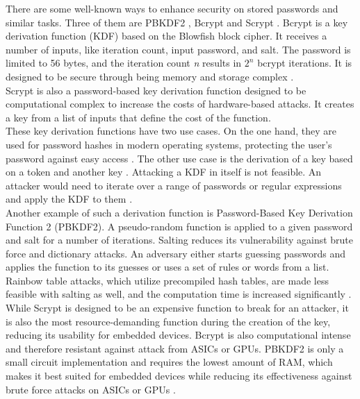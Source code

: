         There are some well-known ways to enhance security on stored passwords and similar tasks. Three of them are PBKDF2 \cite{kaliski_pkcs_2000}, Bcrypt \cite{provos_future-adaptable_1999} and Scrypt \cite{josefsson_scrypt_2016}.
        Bcrypt is a key derivation function (KDF) based on the Blowfish block cipher. It receives a number of inputs, like iteration count, input password, and salt. The password is limited to 56 bytes, and the iteration count \textit{n} results in $2^n$ bcrypt iterations. It is designed to be secure through being memory and storage complex \cite{hatzivasilis_password_2015-1} \cite{provos_future-adaptable_1999}.\\
        Scrypt is also a password-based key derivation function designed to be computational complex to increase the costs of hardware-based attacks. It creates a key from a list of inputs that define the cost of the function.\\
        These key derivation functions have two use cases. On the one hand, they are used for password hashes in modern operating systems, protecting the user's password against easy access \cite{percival_stronger_nodate}. 
        The other use case is the derivation of a key based on a token and another key \cite{camenisch_privacy_2011}. Attacking a KDF in itself is not feasible. An attacker would need to iterate over a range of passwords or regular expressions and apply the KDF to them \cite{percival_stronger_nodate}.\\
        Another example of such a derivation function is Password-Based Key Derivation Function 2 (PBKDF2). A pseudo-random function is applied to a given password and salt for a number of iterations. 
        Salting reduces its vulnerability against brute force and dictionary attacks. An adversary either starts guessing passwords and applies the function to its guesses or uses a set of rules or words from a list. Rainbow table attacks, which utilize precompiled hash tables, are made less feasible with salting as well, and the computation time is increased significantly \cite{kaliski_bkaliskirsasecuritycom_pkcs_2000}. \\
        While Scrypt is designed to be an expensive function to break for an attacker, it is also the most resource-demanding function during the creation of the key, reducing its usability for embedded devices. Bcrypt is also computational intense and therefore resistant against attack from ASICs or GPUs. PBKDF2 is only a small circuit implementation and requires the lowest amount of RAM, which makes it best suited for embedded devices while reducing its effectiveness against brute force attacks on ASICs or GPUs \cite{hatzivasilis_password_2015-1}.\\

